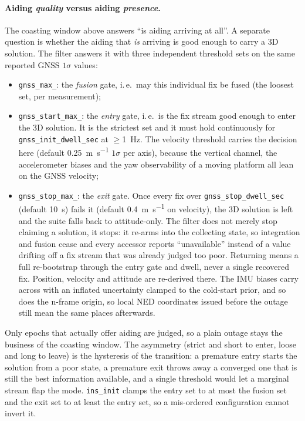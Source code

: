 \documentclass[11pt,a4paper]{article}
\newcommand{\code}[1]{\texttt{#1}}
\begin{document}
\paragraph{Aiding \emph{quality} versus aiding \emph{presence}.} The
coasting window above answers ``is aiding arriving at all''. A separate
question is whether the aiding that \emph{is} arriving is good enough to
carry a 3D solution. The filter answers it with three independent
threshold sets on the same reported GNSS $1\sigma$ values:
\begin{itemize}
  \item \code{gnss\_\allowbreak{}max\_\allowbreak*}: the \emph{fusion} gate, i.\,e.\ may this
        individual fix be fused (the loosest set, per measurement);
  \item \code{gnss\_\allowbreak{}start\_\allowbreak{}max\_\allowbreak*}: the \emph{entry} gate, i.\,e.\ is the fix
        stream good enough to enter the 3D solution. It is the strictest set
        and it must hold continuously for \code{gnss\_\allowbreak{}init\_\allowbreak{}dwell\_\allowbreak{}sec}
        at $\geq$\SI{1}{\hertz}. The velocity threshold carries the
        decision here (default \SI{0.25}{\metre\per\second} $1\sigma$
        per axis), because the vertical channel, the accelerometer biases and
        the yaw observability of a moving platform all lean on the GNSS
        velocity;
  \item \code{gnss\_\allowbreak{}stop\_\allowbreak{}max\_\allowbreak*}: the \emph{exit} gate. Once every fix over
        \code{gnss\_\allowbreak{}stop\_\allowbreak{}dwell\_\allowbreak{}sec} (default \SI{10}{\second}) fails it
        (default \SI{0.4}{\metre\per\second} on velocity), the 3D solution is
        left and the suite falls back to attitude-only. The filter does not
        merely stop claiming a solution, it stops: it re-arms into the
        collecting state, so integration and fusion cease and every accessor
        reports ``unavailable'' instead of a value drifting off a fix stream
        that was already judged too poor. Returning means a full re-bootstrap
        through the entry gate and dwell, never a single recovered fix. Position,
        velocity and attitude are re-derived there. The IMU biases carry across
        with an inflated uncertainty clamped to the cold-start prior, and so does
        the n-frame origin, so local NED coordinates issued before the outage
        still mean the same places afterwards.
\end{itemize}
Only epochs that actually offer aiding are judged, so a plain outage stays the
business of the coasting window. The asymmetry (strict and short to enter, loose
and long to leave) is the hysteresis of the transition: a premature entry
starts the solution from a poor state, a premature exit throws away a converged
one that is still the best information available, and a single threshold would
let a marginal stream flap the mode. \code{ins\_\allowbreak{}init} clamps the entry set to at
most the fusion set and the exit set to at least the entry set, so a mis-ordered
configuration cannot invert it.
\end{document}

